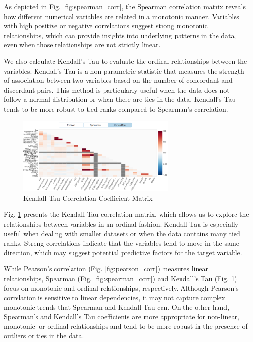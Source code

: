 \documentclass{llncs}
\begin{document}
As depicted in Fig. \ref{fig:spearman_corr}, the Spearman correlation matrix reveals how different numerical variables are related in a monotonic manner. Variables with high positive or negative correlations suggest strong monotonic relationships, which can provide insights into underlying patterns in the data, even when those relationships are not strictly linear.

We also calculate Kendall’s Tau to evaluate the ordinal relationships between the variables. Kendall’s Tau is a non-parametric statistic that measures the strength of association between two variables based on the number of concordant and discordant pairs. This method is particularly useful when the data does not follow a normal distribution or when there are ties in the data. Kendall’s Tau tends to be more robust to tied ranks compared to Spearman’s correlation.

\begin{figure}[htbp]
	\centering
	\includegraphics[width=0.7\textwidth]{images/kendall_tau_correlation.png}
	\caption{Kendall Tau Correlation Coefficient Matrix}
	\label{fig:kendall_tau_corr}
\end{figure}

Fig. \ref{fig:kendall_tau_corr} presents the Kendall Tau correlation matrix, which allows us to explore the relationships between variables in an ordinal fashion. Kendall Tau is especially useful when dealing with smaller datasets or when the data contains many tied ranks. Strong correlations indicate that the variables tend to move in the same direction, which may suggest potential predictive factors for the target variable.

While Pearson’s correlation (Fig. \ref{fig:pearson_corr}) measures linear relationships, Spearman (Fig. \ref{fig:spearman_corr}) and Kendall’s Tau (Fig. \ref{fig:kendall_tau_corr}) focus on monotonic and ordinal relationships, respectively. Although Pearson’s correlation is sensitive to linear dependencies, it may not capture complex monotonic trends that Spearman and Kendall Tau can. On the other hand, Spearman’s and Kendall’s Tau coefficients are more appropriate for non-linear, monotonic, or ordinal relationships and tend to be more robust in the presence of outliers or ties in the data.
\end{document}
